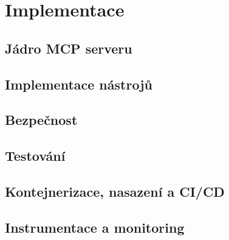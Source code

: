 \chapter{Implementace}
\label{ch:implementace}

\section{Jádro MCP serveru}

\section{Implementace nástrojů}

\section{Bezpečnost}

\section{Testování}

\section{Kontejnerizace, nasazení a CI/CD}

\section{Instrumentace a monitoring}
